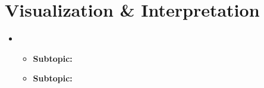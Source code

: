 
\section{Visualization \& Interpretation}
\medskip
\begin{itemize}

    \item {}

    \begin{itemize}
    \item \textbf{Subtopic:} 
    \item \textbf{Subtopic:} 
    \end{itemize}

\end{itemize}


